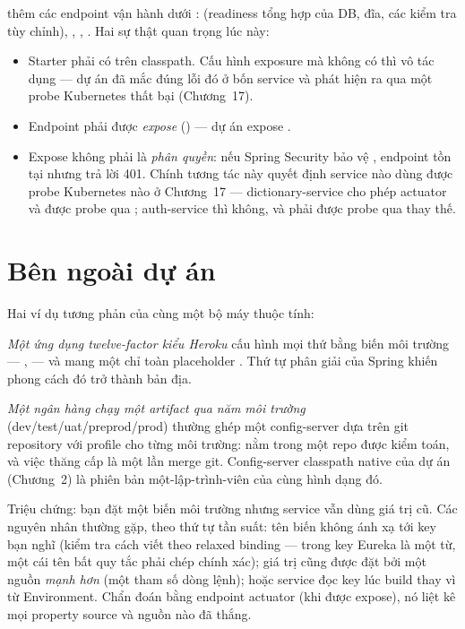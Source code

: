  thêm các endpoint vận hành dưới
:  (readiness tổng hợp của DB, đĩa, các
kiểm tra tùy chỉnh), , , .
Hai sự thật quan trọng lúc này:

\begin{itemize}
  \item Starter phải có trên classpath. Cấu hình exposure mà không có
   thì vô tác dụng --- dự án đã mắc
  đúng lỗi đó ở bốn service và phát hiện ra qua một probe Kubernetes thất
  bại (Chương~17).
  \item Endpoint phải được \emph{expose}
  () --- dự án expose
  .
  \item Expose không phải là \emph{phân quyền}: nếu Spring Security bảo vệ
  , endpoint tồn tại nhưng trả lời 401. Chính tương
  tác này quyết định service nào dùng được probe Kubernetes nào ở
  Chương~17 --- dictionary-service cho phép actuator và được probe qua
  ; auth-service thì không, và phải được probe qua
   thay thế.
\end{itemize}

\section{Bên ngoài dự án}

Hai ví dụ tương phản của cùng một bộ máy thuộc tính:

\emph{Một ứng dụng twelve-factor kiểu Heroku} cấu hình mọi thứ bằng biến
môi trường --- ,  --- và mang một
 chỉ toàn placeholder . Thứ tự phân
giải của Spring khiến phong cách đó trở thành bản địa.

\emph{Một ngân hàng chạy một artifact qua năm môi trường}
(dev/test/uat/preprod/prod) thường ghép một config-server dựa trên git
repository với profile cho từng môi trường:
 nằm trong một repo được kiểm toán, và việc
thăng cấp là một lần merge git. Config-server classpath native của dự án
(Chương~2) là phiên bản một-lập-trình-viên của cùng hình dạng đó.

\begin{pitfall}
Triệu chứng: bạn đặt một biến môi trường nhưng service vẫn dùng giá trị
cũ. Các nguyên nhân thường gặp, theo thứ tự tần suất: tên biến không ánh
xạ tới key bạn nghĩ (kiểm tra cách viết theo relaxed binding ---
 trong key Eureka là một từ, một cái tên bất quy tắc
phải chép chính xác); giá trị cũng được đặt bởi một nguồn \emph{mạnh
hơn} (một tham số dòng lệnh); hoặc service đọc key lúc build thay vì từ
Environment. Chẩn đoán bằng endpoint actuator  (khi
được expose), nó liệt kê mọi property source và nguồn nào đã thắng.
\end{pitfall}

